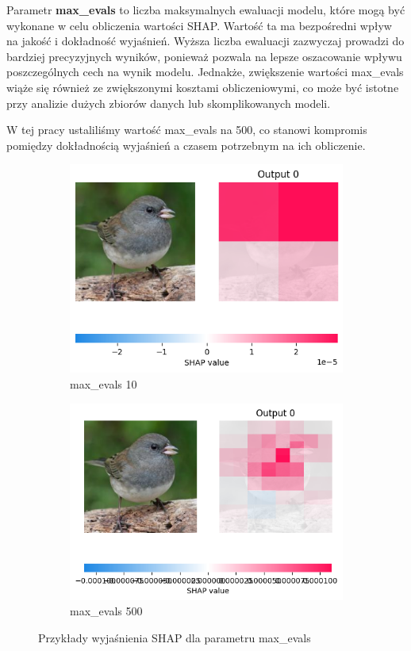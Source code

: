 Parametr \textbf{max\_evals} to liczba maksymalnych ewaluacji modelu, które mogą być wykonane w celu obliczenia wartości SHAP.
Wartość ta ma bezpośredni wpływ na jakość i dokładność wyjaśnień.
Wyższa liczba ewaluacji zazwyczaj prowadzi do bardziej precyzyjnych wyników, ponieważ pozwala na lepsze oszacowanie wpływu poszczególnych cech na wynik modelu.
Jednakże, zwiększenie wartości max\_evals wiąże się również ze zwiększonymi kosztami obliczeniowymi, co może być istotne przy analizie dużych zbiorów danych lub skomplikowanych modeli.

W tej pracy ustaliliśmy wartość max\_evals na 500, co stanowi kompromis pomiędzy dokładnością wyjaśnień a czasem potrzebnym na ich obliczenie.

\begin{figure}[h]
	\centering
	\begin{subfigure}[b]{0.45\textwidth}
		\includegraphics[width=.9\textwidth]{img/parameters/shap/max_evals_10}
		\caption{max\_evals 10}  \label{rys:parameters_lime_numsamples_5}
	\end{subfigure}
	\begin{subfigure}[b]{0.45\textwidth}
		\centering\includegraphics[width=.9\textwidth]{img/parameters/shap/max_evals_500}
		\caption{max\_evals 500}  \label{rys:parameters_lime_numsamples_1000}
	\end{subfigure}
	\caption{Przykłady wyjaśnienia SHAP dla parametru max\_evals}
\end{figure}
